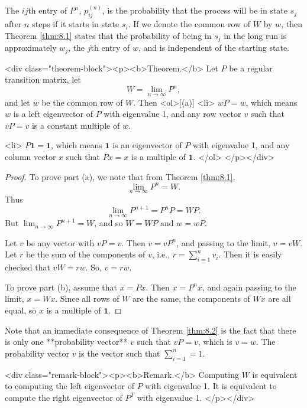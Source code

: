The $ij$th entry of $P^n$, $p^{(n)}_{ij}$, is the probability that the process will be in state $s_j$ after $n$ steps if it starts in state $s_i$. If we denote the common row of $W$ by $w$, then Theorem \ref{thm:8.1} states that the probability of being in $s_j$ in the long run is approximately $w_j$, the $j$th entry of $w$, and is independent of the starting state. 

<div class="theorem-block"><p><b>Theorem.</b> 
\label{thm:8.2}
Let $P$ be a regular transition matrix, let
$$\begin{equation}
    W = \lim_{n\to\infty} P^n,
\end{equation}$$
and let $w$ be the common row of $W$. Then
<ol>[(a)]
    <li> 
    $wP = w$, which means $w$ is a left eigenvector of $P$ with eigenvalue 1, and any row vector $v$ such that $vP = v$ is a constant multiple of $w$.
    
    <li> 
    $P\mathbf{1} = \mathbf{1}$, which means $\mathbf{1}$ is an eigenvector of $P$ with eigenvalue 1, and any column vector $x$ such that $Px = x$ is a multiple of $\mathbf{1}$.
</ol>
</p></div>

\begin{proof}
To prove part (a), we note that from Theorem \ref{thm:8.1}, 
$$\begin{equation}
    \lim_{n\to\infty} P^n = W.
\end{equation}$$
Thus
$$\begin{equation}
    \lim_{n\to\infty} P^{n+1} = P^n P = W P.
\end{equation}$$
But $\lim_{n\to\infty} P^{n+1} = W$, and so $W = WP$ and $w = wP$.

Let $v$ be any vector with $vP = v$. Then $v = vP^n$, and passing to the limit, $v = vW$. Let $r$ be the sum of the components of $v$, i.e., $r = \sum_{i=1}^n v_i$. Then it is easily checked that $vW = rw$. So, $v = rw$.

To prove part (b), assume that $x = Px$. Then $x = P^n x$, and again passing to the limit, $x = Wx$. Since all rows of $W$ are the same, the components of $Wx$ are all equal, so $x$ is a multiple of $\mathbf{1}$.
\end{proof}

Note that an immediate consequence of Theorem \ref{thm:8.2} is the fact that there is only one **probability vector** $v$ such that $vP = v$, which is $v = w$. The probability vector $v$ is the vector such that $\sum_{i=1}^n = 1$.

<div class="remark-block"><p><b>Remark.</b> 
Computing $W$ is equivalent to computing the left eigenvector of $P$ with eigenvalue 1. It is equivalent to compute the right eigenvector of $P^T$ with eigenvalue 1.
</p></div>


